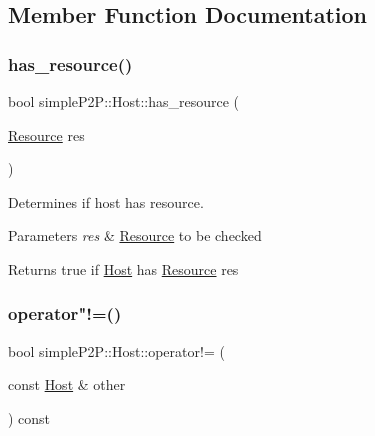 \subsection{Member Function Documentation}
\mbox{\label{classsimpleP2P_1_1Host_a5d4b48eaf05f5353816aae78cbd29c64}} 
\subsubsection{\texorpdfstring{has\+\_\+resource()}{has\_resource()}}
{\footnotesize\ttfamily bool simple\+P2\+P\+::\+Host\+::has\+\_\+resource (\begin{DoxyParamCaption}\item[{\hyperlink{classsimpleP2P_1_1Resource}{Resource}}]{res }\end{DoxyParamCaption})}



Determines if host has resource. 


\begin{DoxyParams}{Parameters}
{\em res} & \hyperlink{classsimpleP2P_1_1Resource}{Resource} to be checked \\
\hline
\end{DoxyParams}
\begin{DoxyReturn}{Returns}
true if \hyperlink{classsimpleP2P_1_1Host}{Host} has \hyperlink{classsimpleP2P_1_1Resource}{Resource} res 
\end{DoxyReturn}
\mbox{\label{classsimpleP2P_1_1Host_a13516e95bf59bb8dd6eea8940f8bb677}} 
\subsubsection{\texorpdfstring{operator"!=()}{operator!=()}}
{\footnotesize\ttfamily bool simple\+P2\+P\+::\+Host\+::operator!= (\begin{DoxyParamCaption}\item[{const \hyperlink{classsimpleP2P_1_1Host}{Host} \&}]{other }\end{DoxyParamCaption}) const}



